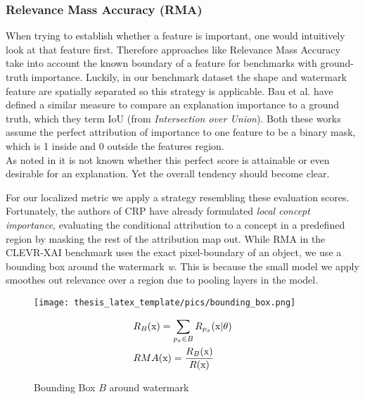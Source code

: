 \subsubsection{Relevance Mass Accuracy (RMA)}
When trying to establish whether a feature is important, one would intuitively look at that feature first. Therefore approaches like Relevance Mass Accuracy take into account the known boundary of a feature for benchmarks with ground-truth importance. Luckily, in our benchmark dataset the shape and watermark feature are spatially separated so this strategy is applicable.
Bau et al. \cite{Bau2017, Bau2020} have defined a similar measure to compare an explanation importance to a ground truth, which they term IoU (from \textit{Intersection over Union}). Both these works assume the perfect attribution of importance to one feature to be a binary mask, which is 1 inside and 0 outside the features region. \\
As noted in \cite{Arras2022} it is not known whether this perfect score is attainable or even desirable for an explanation. Yet the overall tendency should become clear.

For our localized metric we apply a strategy resembling these evaluation scores. 
Fortunately, the authors of CRP have already formulated \textit{local concept importance}, evaluating the conditional attribution to a concept in a predefined region by masking the rest of the attribution map out. 
While RMA in the CLEVR-XAI benchmark uses the exact pixel-boundary of an object, we use a bounding box around the watermark \textit{w}. This is because the small model we apply smoothes out relevance over a region due to pooling layers in the model. \\

\begin{figure}
\begin{minipage}[t]{0.45\textwidth}
    \vspace{-\topskip}
        \texttt{[image: thesis\_latex\_template/pics/bounding\_box.png]}
\end{minipage}
\begin{minipage}[t]{0.45\textwidth}
    \begin{align}\displaystyle
    & R_B(\mathrm{x}) = \sum_{p_x \in B} R_{p_x}(\mathrm{x} | \theta)\\
    & RMA(\mathrm{x}) = \frac{R_B(\mathrm{x})}{R(\mathrm{x})}
    \end{align}
\end{minipage}
\caption{Bounding Box $B$ around watermark}
\label{fig:bounding_box}
\end{figure}

